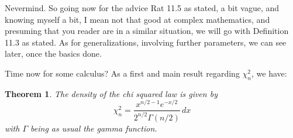 \documentclass[12pt]{amsbook}
\newtheorem{theorem}{Theorem}[chapter]
\begin{document}
\bigskip

Nevermind. So going now for the advice Rat 11.5 as stated, a bit vague, and knowing myself a bit, I mean not that good at complex mathematics, and presuming that you reader are in a similar situation, we will go with Definition 11.3 as stated. As for generalizations, involving further parameters, we can see later, once the basics done.

\bigskip

Time now for some calculus? As a first and main result regarding $\chi_n^2$, we have:

\begin{theorem}
The density of the chi squared law is given by
$$\chi_n^2=\frac{x^{n/2-1}e^{-x/2}}{2^{n/2}\Gamma(n/2)}\,dx$$
with $\Gamma$ being as usual the gamma function.
\end{theorem}
\end{document}
